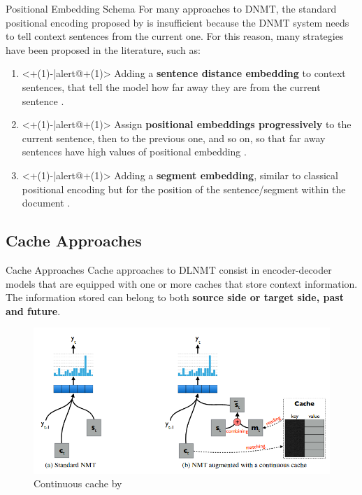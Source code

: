 \begin{frame}{Positional Embedding Schema}
	For many approaches to DNMT, the standard positional encoding proposed by \cite{vaswani_attention_2017} is insufficient because the DNMT system needs to tell context sentences from the current one. For this reason, many strategies have been proposed in the literature, such as:
	\begin{enumerate}
		\item<+(1)-|alert@+(1)> Adding a \textbf{sentence distance embedding} to context sentences, that tell the model how far away they are from the current sentence \cite{voita_when_2019}.
		\item<+(1)-|alert@+(1)> Assign \textbf{positional embeddings progressively} to the current sentence, then to the previous one, and so on, so that far away sentences have high values of positional embedding \cite{li_pretrained_2019}.
		\item<+(1)-|alert@+(1)> Adding a \textbf{segment embedding}, similar to classical positional encoding but for the position of the sentence/segment within the document  \cite{zheng_toward_2020}.
	\end{enumerate}
\end{frame}

\subsection{Cache Approaches}

\begin{frame}{Cache Approaches}
	Cache approaches to DLNMT consist in encoder-decoder models that are equipped with one or more caches that store context information.
	The information stored can belong to both \textbf{source side or target side, past and future}. 

	\begin{figure}
		\centering
		\includegraphics[width=0.7\linewidth]{Images/cache}
		\caption{Continuous cache by \cite{tu_learning_2017}}
		\label{fig:cache}
	\end{figure} 
\end{frame}

